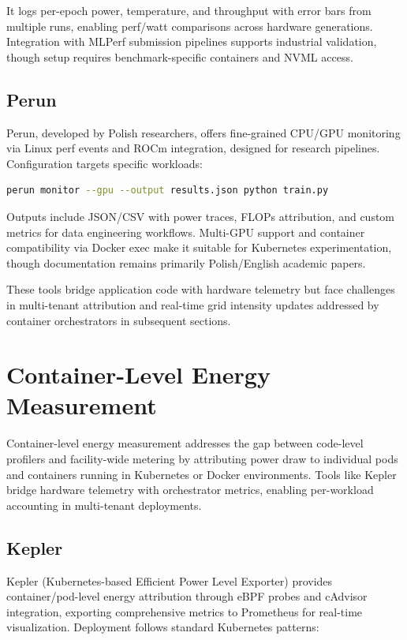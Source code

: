 It logs per-epoch power, temperature, and throughput with error bars from multiple runs, enabling perf/watt comparisons across hardware generations. Integration with MLPerf submission pipelines supports industrial validation, though setup requires benchmark-specific containers and NVML access.

\subsection{Perun}

Perun, developed by Polish researchers, offers fine-grained CPU/GPU monitoring via Linux perf events and ROCm integration, designed for research pipelines. Configuration targets specific workloads:

\begin{lstlisting}[language=Bash]
perun monitor --gpu --output results.json python train.py
\end{lstlisting}

Outputs include JSON/CSV with power traces, FLOPs attribution, and custom metrics for data engineering workflows. Multi-GPU support and container compatibility via Docker exec make it suitable for Kubernetes experimentation, though documentation remains primarily Polish/English academic papers.

These tools bridge application code with hardware telemetry but face challenges in multi-tenant attribution and real-time grid intensity updates addressed by container orchestrators in subsequent sections.\@

\section{Container-Level Energy Measurement}

Container-level energy measurement addresses the gap between code-level profilers and facility-wide metering by attributing power draw to individual pods and containers running in Kubernetes or Docker environments. Tools like Kepler bridge hardware telemetry with orchestrator metrics, enabling per-workload accounting in multi-tenant deployments.

\subsection{Kepler}

Kepler (Kubernetes-based Efficient Power Level Exporter) provides container/pod-level energy attribution through eBPF probes and cAdvisor integration, exporting comprehensive metrics to Prometheus for real-time visualization. Deployment follows standard Kubernetes patterns:

